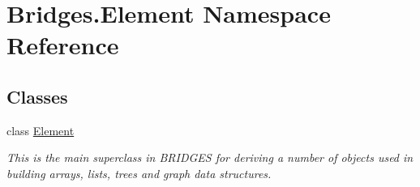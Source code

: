 \hypertarget{namespace_bridges_1_1_element}{}\section{Bridges.\+Element Namespace Reference}
\label{namespace_bridges_1_1_element}
\subsection*{Classes}
\begin{DoxyCompactItemize}
\item 
class \hyperlink{class_bridges_1_1_element_1_1_element}{Element}
\begin{DoxyCompactList}\small\item\em This is the main superclass in B\+R\+I\+D\+G\+E\+S for deriving a number of objects used in building arrays, lists, trees and graph data structures. \end{DoxyCompactList}\end{DoxyCompactItemize}
